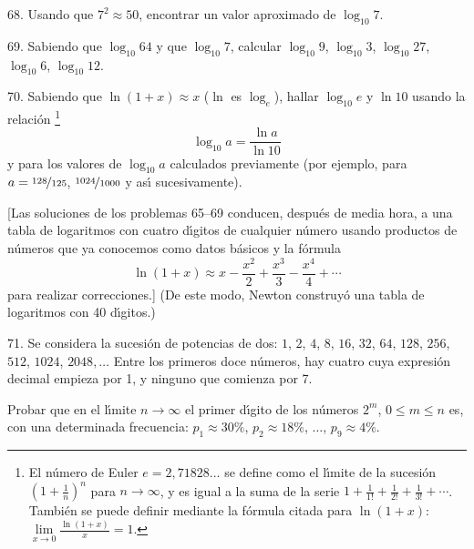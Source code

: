 \begin{problem}{68.}
	Usando que $7^2 \approx 50$, encontrar un valor aproximado de $\log_{10} 7$.
\end{problem}

\begin{sloppypar}
\begin{problem}{69.}
	Sabiendo que $\log_{10} 64$ y que $\log_{10} 7$, calcular $\log_{10} 9$, $\log_{10} 3$, $\log_{10} 27$, $\log_{10} 6$, $\log_{10} 12$.
\end{problem}
\end{sloppypar}

\begin{problem}{70.}
	Sabiendo que $\ln (1+x) \approx x$ ($\ln$ es $\log_e$), hallar $\log_{10} e$ y
	$\ln 10$ usando la relaci\'on \footnote{El n\'umero de Euler $e = 2{,}71828\dots$ se define como el l\'{\i}mite de la sucesi\'on
	$\left(1+\frac1n\right)^n$ para $n\to \infty$, y es igual a la suma de la serie
	$1+\frac 1{1!} +\frac 1{2!}+\frac 1{3!}+\dotsb$. Tambi\'en se puede definir mediante la f\'ormula citada para
	$\ln (1+x)$: $\lim\limits_{x\to 0}\frac{\ln(1+x)}{x} = 1$.}
	\begin{equation*}
		\log_{10} a=\frac{\ln a}{\ln 10}
	\end{equation*}
	y para los valores de $\log_{10} a$ calculados previamente (por ejemplo, para $a=\nicefrac{128}{125}$, $\nicefrac{1024}{1000}$ y as\'{\i} sucesivamente).

	[Las soluciones de los problemas 65--69 conducen, despu\'es de media hora, a una tabla de logaritmos con cuatro d\'{\i}gitos de cualquier n\'umero usando productos de n\'umeros que ya conocemos como datos b\'asicos y la f\'ormula
	\begin{equation*}
		\ln (1+x) \approx x-\frac{x^2}{2}+\frac{x^3}{3}-\frac{x^4}{4}+\dotsb
	\end{equation*}
	para realizar correcciones.] (De este modo, Newton construy\'o una tabla de logaritmos con 40 d\'{\i}gitos.)
\end{problem}

\begin{problem}{71.}
	Se considera la sucesi\'on de potencias de dos: $1$, $2$, $4$, $8$, $16$, $32$, $64$,
	$128$, $256$, $512$, $1024$, $2048, \dotsc$ Entre los primeros doce n\'umeros, hay cuatro cuya expresi\'on decimal empieza por 1, y ninguno que comienza por 7.

	
	Probar que en el l\'{\i}mite $n \to \infty$ el primer d\'{\i}gito de los n\'umeros $2^m$,
	$0\leqslant m \leqslant n$ es, con una determinada frecuencia:
	$p_1 \approx 30\%$, $p_2 \approx 18\%$,  $\dotsc$, $p_9 \approx 4\%$.
\end{problem}

